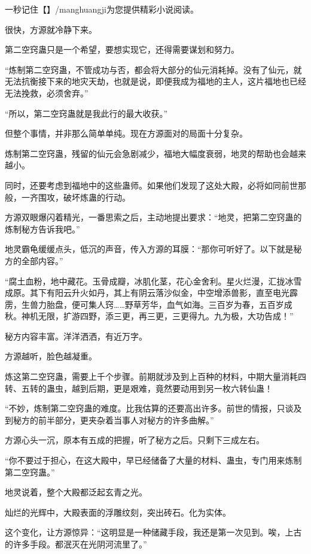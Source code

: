 
\begin{this_body}

一秒记住【】/manghuangji为您提供精彩小说阅读。

很快，方源就冷静下来。

第二空窍蛊只是一个希望，要想实现它，还得需要谋划和努力。

“炼制第二空窍蛊，不管成功与否，都会将大部分的仙元消耗掉。没有了仙元，就无法抗衡接下来的地灾天劫，也就是说，即便我成为福地的主人，这片福地也已经无法挽救，必须舍弃。”

“所以，第二空窍蛊就是我此行的最大收获。”

但整个事情，并非那么简单单纯。现在方源面对的局面十分复杂。

炼制第二空窍蛊，残留的仙元会急剧减少，福地大幅度衰弱，地灵的帮助也会越来越小。

同时，还要考虑到福地中的这些蛊师。如果他们发现了这处大殿，必将如同前世那般，一齐围攻，破坏炼蛊的行动。

方源双眼爆闪着精光，一番思索之后，主动地提出要求：“地灵，把第二空窍蛊的炼制秘方告诉我吧。”

地灵霸龟缓缓点头，低沉的声音，传入方源的耳膜：“那你可听好了。以下就是秘方的全部内容。”

“腐土血粉，地中藏花。玉骨成瓣，冰肌化茎，花心金舍利。星火烂漫，汇拢冰雪成原。其下有阳云升火如丹，其上有阴云落沙似金，中空增添兽影，直至电光霹雳，生兽力胎盘，便可集人窍……野草芳华，血气如海。三百岁为春，五百岁成秋。神机无限，扩游四野，添三更，再三更，三更得九。九为极，大功告成！”

秘方内容丰富。洋洋洒洒，有近万字。

方源越听，脸色越凝重。

炼这第二空窍蛊，需要上千个步骤。前期就涉及到上百种的材料，中期大量消耗四转、五转的蛊虫，越到后期，更是艰难，竟然要动用到另一枚六转仙蛊！

“不妙，炼制第二空窍蛊的难度。比我估算的还要高出许多。前世的情报，只谈及到秘方的前半部分，更夹杂着当事人对秘方的许多曲解。”

方源心头一沉，原本有五成的把握，听了秘方之后。只剩下三成左右。

“你不要过于担心，在这大殿中，早已经储备了大量的材料、蛊虫，专门用来炼制第二空窍蛊。”

地灵说着，整个大殿都泛起玄青之光。

灿烂的光辉中，大殿表面的浮雕纹刻，突出砖石。化为实体。

这个变化，让方源惊异：“这明显是一种储藏手段，我还是第一次见到。唉，上古的许多手段。都泯灭在光阴河流里了。”


\end{this_body}
